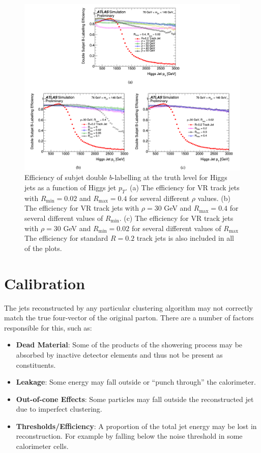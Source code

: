 \begin{figure}
	\centering
	\includegraphics[width=\textwidth]{vr_jet_optimization}
	\caption{
	Efficiency of subjet double $b$-labelling at the truth level for Higgs jets as a function of Higgs jet $p_T$.
	(a) The efficiency for VR track jets with $R_{\mathrm{min}} = 0.02$ and $R_{\mathrm{max}} = 0.4$ for several different $\rho$ values.
	(b) The efficiency for VR track jets with $\rho = 30$ GeV and $R_{\mathrm{max}} = 0.4$ for several different values of $R_{\mathrm{min}}$.
	(c) The efficiency for VR track jets with $\rho = 30$ GeV and $R_{\mathrm{min}} = 0.02$ for several different values of $R_{\mathrm{max}}$
	The efficiency for standard $R = 0.2$ track jets is also included in all of the plots.
	\cite{ATL-PHYS-PUB-2017-010}
	}
	\label{fig:vr_jet_optimization}
\end{figure}

\section{Calibration}
\label{sec:jet_calibration}
The jets reconstructed by any particular clustering algorithm may not correctly match the true four-vector of the original parton.
There are a number of factors responsible for this, such as:
\begin{itemize}
    \itemsep0em 
    \item \textbf{Dead Material}: Some of the products of the showering process may be absorbed by inactive detector elements and thus not be present as constituents.
    \item \textbf{Leakage}: Some energy may fall outside or ``punch through'' the calorimeter.
    \item \textbf{Out-of-cone Effects}: Some particles may fall outside the reconstructed jet due to imperfect clustering.
    \item \textbf{Thresholds/Efficiency}: A proportion of the total jet energy may be lost in reconstruction. For example by falling below the noise threshold in some calorimeter cells.
\end{itemize}

